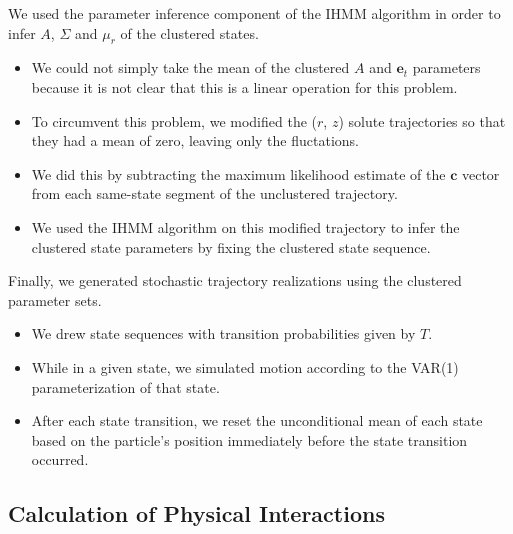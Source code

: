\documentclass{article}
\begin{document}

  We used the parameter inference component of the IHMM algorithm in order to 
  infer $A$, $\Sigma$ and $\mu_r$ of the clustered states.
  \begin{itemize}
   \item We could not simply take the mean of the clustered 
   $A$ and $\mathbf{e}_t$ parameters because it is not clear that this is a linear 
   operation for this problem. 
   \item To circumvent this problem, we modified the ($r$, $z$) solute
   trajectories so that they had a mean of zero, leaving only the 
   fluctations. 
   \item We did this by subtracting the maximum likelihood estimate
   of the $\mathbf{c}$ vector from each same-state segment of the unclustered
   trajectory.   
   \item We used the IHMM algorithm on this modified trajectory to infer
   the clustered state parameters by fixing the clustered state sequence. 
  \end{itemize}
  
  \noindent Finally, we generated stochastic trajectory realizations using the clustered
  parameter sets.
  \begin{itemize}
    \item We drew state sequences with transition probabilities given by $T$.
    \item While in a given state, we simulated motion according to the VAR(1)
    parameterization of that state.
    \item After each state transition, we reset the unconditional mean of each 
    state based on the particle's position immediately before the state transition
    occurred.
  \end{itemize} 
  
  \subsection{Calculation of Physical Interactions}\label{method:interactions}
  
\end{document}
